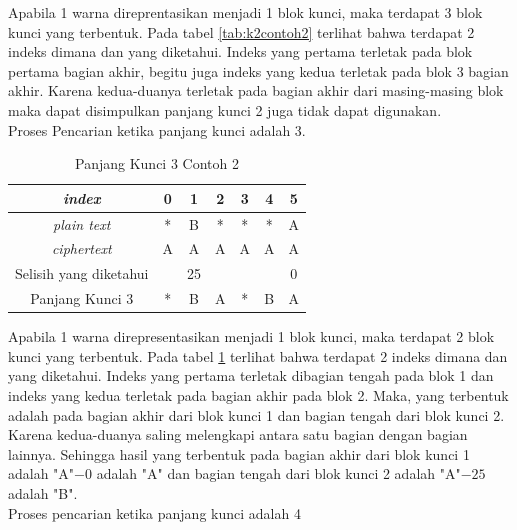 	Apabila 1 warna direprentasikan menjadi 1 blok kunci, maka terdapat 3 blok kunci yang terbentuk. Pada tabel \ref{tab:k2contoh2} terlihat bahwa terdapat 2 indeks dimana \plaintext dan \ciphertext yang diketahui. Indeks yang pertama terletak pada blok pertama bagian akhir, begitu juga indeks yang kedua terletak pada blok 3 bagian akhir. Karena kedua-duanya terletak pada bagian akhir dari masing-masing blok maka dapat disimpulkan panjang kunci 2 juga tidak dapat digunakan.
	\\
	Proses Pencarian ketika panjang kunci adalah 3.
	\begin{table}[H]
	 	\centering
	 	\setlength{\arrayrulewidth}{.08em}
	 	\begin{tabular}{|c|c|c|c|c|c|c|}\hline
		\textit{index}&0&1&2&3&4&5\\ \hline
	 	\textit{plain text}&\cellcolor{blue!15}*&\cellcolor{blue!15}B&\cellcolor{blue!15}*&\cellcolor{green!15}*&\cellcolor{green!15}*&\cellcolor{green!15}A\\ \hline
	 	\textit{ciphertext}&\cellcolor{blue!15}A&\cellcolor{blue!15}A&\cellcolor{blue!15}A&\cellcolor{green!15}A&\cellcolor{green!15}A&\cellcolor{green!15}A\\ \hline
	 	Selisih yang diketahui& &25& & & &0\\ \hline
	 	Panjang Kunci 3 &*&B&A&*&B&A \\ \hline
	 	\end{tabular}
	 	\caption{Panjang Kunci 3 Contoh 2}
	 	\label{tab:k3contoh2}
	\end{table}	
	Apabila 1 warna direpresentasikan menjadi 1 blok kunci, maka terdapat 2 blok kunci yang terbentuk. Pada tabel \ref{tab:k3contoh2} terlihat bahwa terdapat 2 indeks dimana \plaintext dan \ciphertext yang diketahui. Indeks yang pertama terletak dibagian tengah pada blok 1 dan indeks yang kedua terletak pada bagian akhir pada blok 2. Maka, \plaintext yang terbentuk adalah pada bagian akhir dari blok kunci 1 dan bagian tengah dari blok kunci 2. Karena kedua-duanya saling melengkapi antara satu bagian dengan bagian lainnya. Sehingga hasil yang terbentuk pada bagian akhir dari blok kunci 1 adalah "A"$-0$ adalah "A" dan bagian tengah dari blok kunci 2 adalah "A"$-25$ adalah "B". 
	\\
	Proses pencarian ketika panjang kunci adalah 4
